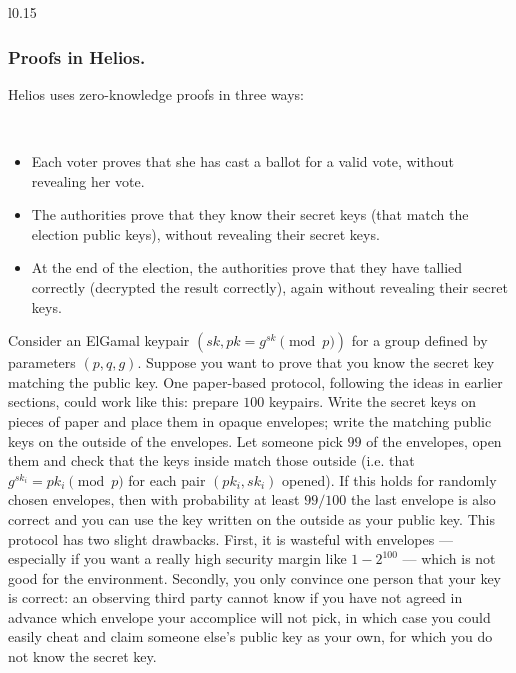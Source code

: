 \documentclass[envcountsame]{llncs}
\newenvironment{helios}{\begin{framed}
\vspace{-18pt}
\begin{wrapfigure}{l}{0.15\textwidth}
\vspace{-12pt}\quad{\Huge \Sun}
\end{wrapfigure}}{\end{framed}}
\begin{document}
\begin{helios}
\subsubsection{Proofs in Helios.}
Helios uses zero-knowledge proofs in three ways:
\vspace{6pt}

\hspace{-12pt}\ 
\begin{minipage}{0.8\textwidth}
\begin{itemize}
\item Each voter proves that she has cast a ballot for a valid vote, without
revealing her vote.
\item The authorities prove that they know their secret keys (that match the
election public keys), without revealing their secret keys.
\item At the end of the election, the authorities prove that they have tallied
correctly (decrypted the result correctly), again without revealing their secret
keys.
\end{itemize}
\end{minipage}
\end{helios}

Consider an ElGamal keypair $(sk, pk = g^{sk} \pmod{p})$ for a group defined by
parameters $(p, q, g)$. Suppose you want to prove that you know the secret key
matching the public key. One paper-based protocol, following the ideas in
earlier sections, could work like this: prepare $100$ keypairs. Write the secret
keys on pieces of paper and place them in opaque envelopes; write the matching
public keys on the outside of the envelopes. Let someone pick $99$ of the
envelopes, open them and check that the keys inside match those outside (i.e.
that $g^{sk_i} = pk_i \pmod{p}$ for each pair $(pk_i, sk_i)$ opened). If this
holds for randomly chosen envelopes, then with probability at least $99/100$ the
last envelope is also correct and you can use the key written on the outside as
your public key. This protocol has two slight drawbacks. First, it is wasteful
with envelopes --- especially if you want a really high security margin like
$1 - 2^{100}$ --- which is not good for the environment. Secondly, you only
convince one person that your key is correct: an observing third party cannot
know if you have not agreed in advance which envelope your accomplice will not
pick, in which case you could easily cheat and claim someone else's public key
as your own, for which you do not know the secret key.
\end{document}
